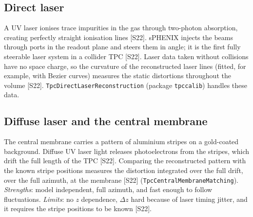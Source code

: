 \documentclass[11pt,letterpaper]{article}
\begin{document}
\subsection{Direct laser}
A UV laser ionises trace impurities in the gas through two-photon absorption, creating perfectly straight ionisation lines [S22].
sPHENIX injects the beams through ports in the readout plane and steers them in angle; it is the first fully steerable laser system in a collider TPC [S22].
Laser data taken without collisions have no space charge, so the curvature of the reconstructed laser lines (fitted, for example, with Bezier curves) measures the static distortions throughout the volume [S22].
\texttt{TpcDirectLaserReconstruction} (package \texttt{tpccalib}) handles these data.

\subsection{Diffuse laser and the central membrane}
The central membrane carries a pattern of aluminium stripes on a gold-coated background. Diffuse UV laser light releases photoelectrons from the stripes, which drift the full length of the TPC [S22].
Comparing the reconstructed pattern with the known stripe positions measures the distortion integrated over the full drift, over the full azimuth, at the membrane [S22] (\texttt{TpcCentralMembraneMatching}).
\emph{Strengths}: model independent, full azimuth, and fast enough to follow fluctuations. \emph{Limits}: no $z$ dependence, $\Delta z$ hard because of laser timing jitter, and it requires the stripe positions to be known [S22].
\end{document}
